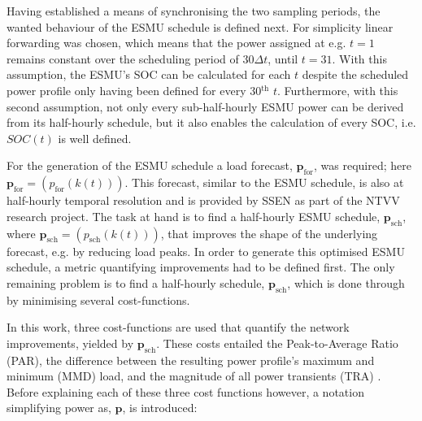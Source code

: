 

Having established a means of synchronising the two sampling periods, the wanted behaviour of the ESMU schedule is defined next.
For simplicity linear forwarding was chosen, which means that the power assigned at e.g. $t=1$ remains constant over the scheduling period of $30\Delta t$, until $t=31$.
With this assumption, the ESMU's SOC can be calculated for each $t$ despite the scheduled power profile only having been defined for every 30$^\text{th}$ $t$.
Furthermore, with this second assumption, not only every sub-half-hourly ESMU power can be derived from its half-hourly schedule, but it also enables the calculation of every SOC, i.e. $SOC(t)$ is well defined.


For the generation of the ESMU schedule a load forecast, $\textbf{p}_\text{for}$, was required; here $\textbf{p}_\text{for} = (p_\text{for}(k(t)))$.
This forecast, similar to the ESMU schedule, is also at half-hourly temporal resolution and is provided by SSEN as part of the NTVV research project.
The task at hand is to find a half-hourly ESMU schedule, $\textbf{p}_\text{sch}$, where $\textbf{p}_\text{sch} = (p_\text{sch}(k(t)))$, that improves the shape of the underlying forecast, e.g. by reducing load peaks.
In order to generate this optimised ESMU schedule, a metric quantifying improvements had to be defined first.
The only remaining problem is to find a half-hourly schedule, $\textbf{p}_\text{sch}$, which is done through by minimising several cost-functions.

In this work, three cost-functions are used that quantify the network improvements, yielded by $\textbf{p}_\text{sch}$.
These costs entailed the Peak-to-Average Ratio (PAR), the difference between the resulting power profile's maximum and minimum (MMD) load, and the magnitude of all power transients (TRA) \cite{Mohsenian-Rad2010, Mostafa2016}.
Before explaining each of these three cost functions however, a notation simplifying power as, $\textbf{p}$, is introduced:

